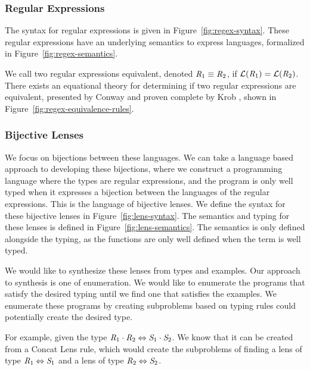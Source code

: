 \subsubsection{Regular Expressions}


The syntax for regular expressions is given in Figure~\ref{fig:regex-syntax}.
These regular expressions have an underlying semantics to express languages,
formalized in Figure~\ref{fig:regex-semantics}.


We call two regular expressions equivalent, denoted $\mathit{R}_1\equiv\mathit{R}_2$,
if $\mathcal{L}(\mathit{R}_1)=\mathcal{L}(\mathit{R}_2)$.
There exists an equational theory for determining if two regular expressions are equivalent,
presented by Conway \cite{conway}
and proven complete by Krob \cite{Krob},
shown in Figure~\ref{fig:regex-equivalence-rules}.

\subsubsection{Bijective Lenses}


We focus on bijections between these languages.
We can take a language based approach to developing these bijections,
where we construct a programming language where the types are regular expressions,
and the program is only well typed when it expresses a bijection between the languages
of the regular expressions.
This is the language of bijective lenses.
We define the syntax for these bijective lenses in Figure~\ref{fig:lens-syntax}.
The semantics and typing for these lenses is defined in Figure~\ref{fig:lens-semantics}.
The semantics is only defined alongside the typing, as the functions are only
well defined when the term is well typed.

We would like to synthesize these lenses from types and examples.
Our approach to synthesis is one of enumeration.
We would like to enumerate the programs that satisfy the desired typing until
we find one that satisfies the examples.
We enumerate these programs by creating subproblems based on typing rules
could potentially create the desired type.

For example, given the type $\mathit{R}_1\cdot\mathit{R}_2\Leftrightarrow\mathit{S}_1\cdot\mathit{S}_2$.
We know that it can be created from a Concat Lens rule,
which would create the subproblems of finding a lens of type $\mathit{R}_1\Leftrightarrow\mathit{S}_1$
and a lens of type $\mathit{R}_2\Leftrightarrow\mathit{S}_2$.

